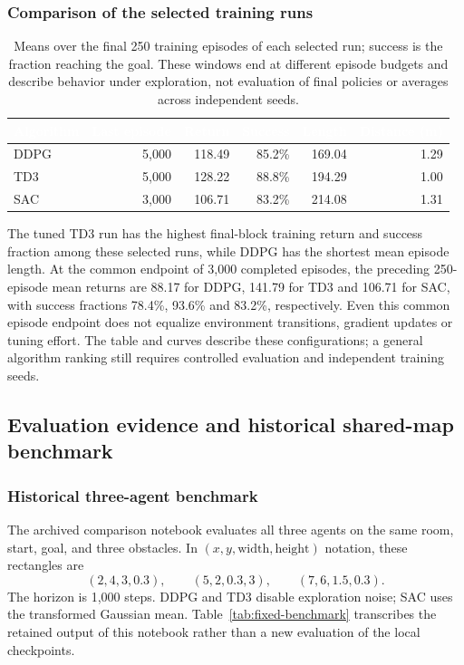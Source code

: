 \documentclass[11pt,a4paper]{article}
\theoremstyle{definition}
\theoremstyle{plain}
\theoremstyle{remark}
\newcommand{\thcell}[1]{\textcolor{white}{\textbf{#1}}}
\begin{document}
\subsubsection{Comparison of the selected training runs}

\begin{table}[h!]
\centering\small
\begin{tabularx}{\linewidth}{@{}Yrrrrr@{}}
\toprule
{}\thcell{Algorithm}&\thcell{Last episode}&\thcell{Return}&\thcell{Success}&\thcell{Length}&\thcell{Distance (m)}\\
\midrule
DDPG&5,000&118.49&85.2\%&169.04&1.29\\
 TD3&5,000&128.22&88.8\%&194.29&1.00\\
SAC&3,000&106.71&83.2\%&214.08&1.31\\
\bottomrule
\end{tabularx}
\caption{Means over the final 250 training episodes of each selected run; success is the fraction reaching the goal. These windows end at different episode budgets and describe behavior under exploration, not evaluation of final policies or averages across independent seeds.}
\label{tab:training-summaries}
\end{table}

The tuned TD3 run has the highest final-block training return and success fraction among these selected runs, while DDPG has the shortest mean episode length. At the common endpoint of 3,000 completed episodes, the preceding 250-episode mean returns are 88.17 for DDPG, 141.79 for TD3 and 106.71 for SAC, with success fractions 78.4\%, 93.6\% and 83.2\%, respectively. Even this common episode endpoint does not equalize environment transitions, gradient updates or tuning effort. The table and curves describe these configurations; a general algorithm ranking still requires controlled evaluation and independent training seeds.
\FloatBarrier

\subsection{Evaluation evidence and historical shared-map benchmark}
\label{sec:fixed-eval}

\subsubsection{Historical three-agent benchmark}

The archived comparison notebook evaluates all three agents on the same room, start, goal, and three obstacles. In $(x,y,\text{width},\text{height})$ notation, these rectangles are
\[
 (2,4,3,0.3),\qquad(5,2,0.3,3),\qquad(7,6,1.5,0.3).
\]
The horizon is 1,000 steps. DDPG and TD3 disable exploration noise; SAC uses the transformed Gaussian mean. Table~\ref{tab:fixed-benchmark} transcribes the retained output of this notebook rather than a new evaluation of the local checkpoints.
\end{document}
